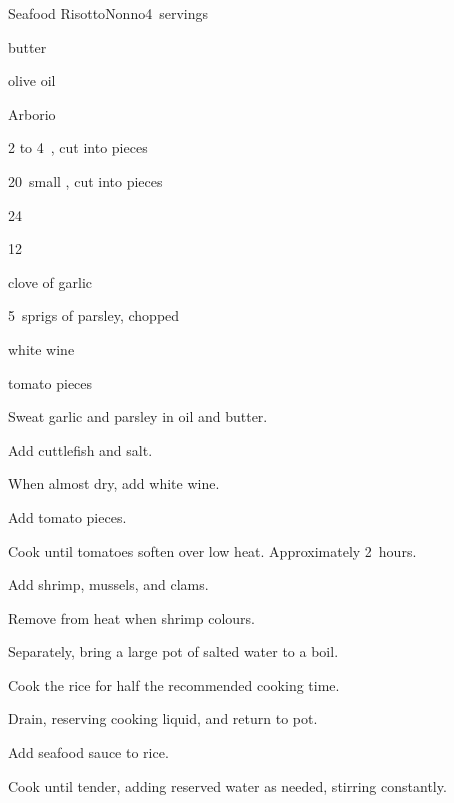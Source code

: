 \begin{recipe}{Seafood Risotto}{Nonno}{4~servings}

\begin{ingredients}
\item butter
\item olive oil
\item {} Arborio 
\item 2 to 4~, cut into \inch{\half} pieces
\item 20~small , cut into \inch{\half} pieces
\item 24~
\item 12~
\item clove of garlic
\item 5~sprigs of parsley, chopped
\item {} white wine
\item \ltr{\half} tomato pieces
\end{ingredients}

\begin{directions}
\item Sweat garlic and parsley in oil and butter.
\item Add cuttlefish and salt.
\item When almost dry, add white wine.
\item Add tomato pieces.
\item Cook until tomatoes soften over low heat. Approximately 2~hours.
\item Add shrimp, mussels, and clams.
\item Remove from heat when shrimp colours.
\item Separately, bring a large pot of salted water to a boil.
\item Cook the rice for half the recommended cooking time.
\item Drain, reserving cooking liquid, and return to pot.
\item Add seafood sauce to rice.
\item Cook until tender, adding reserved water as needed, stirring constantly.
\end{directions}

\end{recipe}
